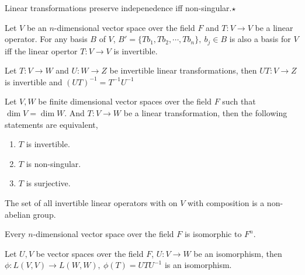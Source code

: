 	\begin{theorem}
		Linear transformations preserve indepenedence iff non-singular.$\star$
	\end{theorem}
	\begin{remark}
		Let $V$ be an $n$-dimensional vector space over the field $F$ and $T : V \to V$ be a linear operator. For any basis $B$ of $V$, $B' = \{ Tb_1, Tb_2, \cdots, Tb_n \},\ b_j \in B$ is also a basis for $V$ iff the linear opertor $T : V \to V$ is invertible.
	\end{remark}
	\begin{theorem}
		Let $T : V \to W$ and $U : W \to Z$ be invertible linear transformations, then $UT : V \to Z$ is invertible and $(UT)^{-1} = T^{-1}U^{-1}$
	\end{theorem}
	\begin{theorem}
		Let $V,W$ be finite dimensional vector spaces over the field $F$ such that $\dim V = \dim W$. And $T : V \to W$ be a linear transformation, then the following statements are equivalent,
		\begin{enumerate}
			\item $T$ is invertible.
			\item $T$ is non-singular.
			\item $T$ is surjective.
		\end{enumerate}
	\end{theorem}
	\begin{theorem}
		The set of all invertible linear operators with on $V$ with composition is a non-abelian group.
	\end{theorem}
	\begin{theorem}
		Every $n$-dimensional vector space over the field $F$ is isomorphic to $F^n$.
	\end{theorem}
	\begin{theorem}
		Let $U,V$ be vector spaces over the field $F$, $U : V \to W$ be an isomorphism, then $\phi : L(V,V) \to L(W,W),\ \phi(T) = UTU^{-1}$ is an isomorphism.
	\end{theorem}
